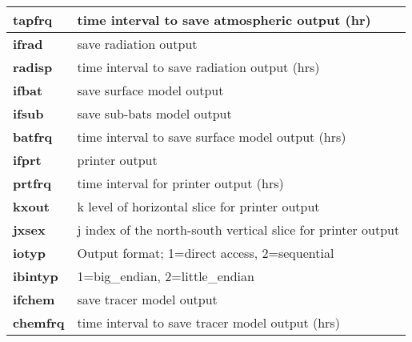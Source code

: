 \begin{table}[h]
\begin{center}
\begin{tabular}{|l|l|}
\hspace{.3cm} {\footnotesize {\bf tapfrq}} & {\footnotesize time interval to save atmospheric output (hr)} \\ \hline
{\footnotesize {\bf ifrad}}  & {\footnotesize save radiation output } \\ \hline
\hspace{.3cm} {\footnotesize {\bf radisp}} & {\footnotesize time interval to save radiation output (hrs) } \\  \hline
{\footnotesize {\bf ifbat}}  & {\footnotesize save surface model output } \\  \hline
{\footnotesize {\bf ifsub}}  & {\footnotesize save sub-bats model output } \\  \hline
\hspace{.3cm} {\footnotesize {\bf batfrq}} & {\footnotesize time interval to save surface model output (hrs) }  \\ \hline
{\footnotesize {\bf ifprt}}  & {\footnotesize printer output} \\ \hline
\hspace{.3cm} {\footnotesize {\bf prtfrq}} & {\footnotesize time interval for printer output (hrs)} \\ \hline
\hspace{.3cm} {\footnotesize {\bf kxout}}  & {\footnotesize k level of horizontal slice for printer output} \\ \hline
\hspace{.3cm} {\footnotesize {\bf jxsex}}  & {\footnotesize j index of the north-south vertical slice for printer output} \\ \hline
{\footnotesize {\bf iotyp}}  & {\footnotesize Output format; 1=direct access, 2=sequential} \\ \hline
\hspace{.3cm} {\footnotesize {\bf ibintyp}}  & {\footnotesize 1=big\_endian, 2=little\_endian} \\ \hline
{\footnotesize {\bf ifchem}}  & {\footnotesize save tracer model output } \\ \hline
\hspace{.3cm} {\footnotesize {\bf chemfrq}} & {\footnotesize time interval to save tracer model output (hrs) } \\  \hline
\end{tabular}
\end{center}
\end{table}

